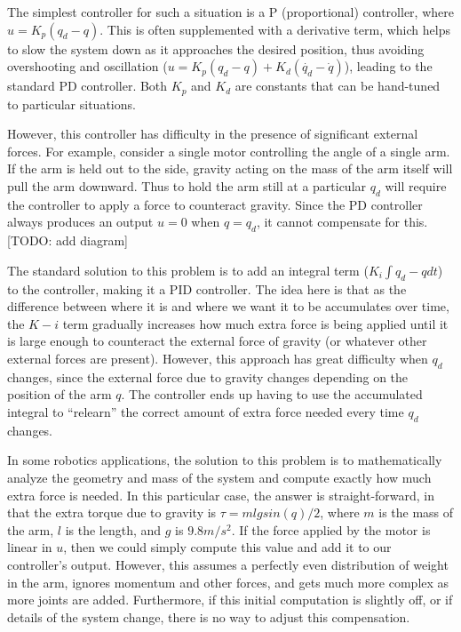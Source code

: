 \documentclass{frontiersSCNS} %
\begin{document}
The simplest controller for such a situation is a P (proportional) controller,
where $u=K_p(q_d - q)$.  This is often supplemented with a derivative term,
which helps to slow the system down as it approaches the desired position,
thus avoiding overshooting and oscillation ($u=K_p(q_d - q) + K_d(\dot{q_d} - \dot{q})$),
leading to the standard PD controller.  Both $K_p$ and $K_d$ are constants that can be
hand-tuned to particular situations.

However, this controller has difficulty in the presence of significant external
forces.  For example, consider a single motor controlling the angle of a single
arm.  If the arm is held out to the side, gravity acting on the mass of the
arm itself will pull the arm downward.  Thus to hold the arm still at a
particular $q_d$ will require the controller to apply a force to counteract
gravity.  Since the PD controller always produces an output $u=0$ when $q=q_d$,
it cannot compensate for this. [TODO: add diagram]

The standard solution to this problem is to add an integral term ($K_i \int{q_d-q dt}$)
to the controller, making it a PID controller.  The idea here is that as the difference between where it is and
where we want it to be accumulates over time, the $K-i$ term gradually increases
how much extra force is being applied until it is large enough to counteract
the external force of gravity (or whatever other external forces are present).
However, this approach has great difficulty when $q_d$ changes, since the
external force due to gravity changes depending on the position of the arm $q$.
The controller ends up having to use the accumulated integral to ``relearn'' the
correct amount of extra force needed every time $q_d$ changes.

In some robotics applications, the solution to this problem is to mathematically
analyze the geometry and mass of the system and compute exactly how much extra
force is needed.  In this particular case, the answer is straight-forward,
in that the extra torque due to gravity is $\tau=m l g sin(q) / 2$, where
$m$ is the mass of the arm, $l$ is the length, and $g$ is $9.8m/s^2$.  If the
force applied by the motor is linear in $u$, then we could simply compute this
value and add it to our controller's output.  However, this assumes a perfectly
even distribution of weight in the arm, ignores momentum and other forces, and 
gets much more complex as more joints are added.  Furthermore, if this
initial computation is slightly off, or if details of the system change,
there is no way to adjust this compensation.
\end{document}
